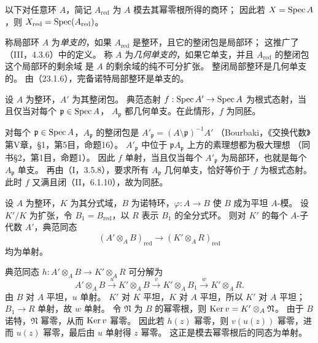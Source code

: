 
以下对任意环 $A$，简记 $A_{\mathrm{red}}$ 为 $A$ 模去其幂零根所得的商环；
因此若 $X=\operatorname{Spec} A$，则 $X_{\mathrm{red}}=\operatorname{Spec}(A_{\mathrm{red}})$。

称局部环 $A$ 为\emph{单支的}，如果 $A_{\mathrm{red}}$ 是整环，且它的整闭包是局部环；
这推广了（III，4.3.6）中的定义。
称 $A$ 为\emph{几何单支的}，如果它单支，并且 $A_{\mathrm{red}}$ 的整闭包这个局部环的剩余域
是 $A$ 的剩余域的纯不可分扩张。
整闭局部整环是几何单支的。
由（23.1.6），完备诺特局部整环是单支的。

设 $A$ 为整环，$A'$ 为其整闭包。
典范态射 $f:\operatorname{Spec} A'\to\operatorname{Spec} A$ 为根式态射，当且仅当对每个 $\mathfrak p\in\operatorname{Spec} A$，
$A_{\mathfrak p}$ 都几何单支。在此情形，$f$ 为同胚。

\eproof
对每个 $\mathfrak p\in\operatorname{Spec} A$，$A_{\mathfrak p}$ 的整闭包是
$A'_{\mathfrak p}=(A\setminus\mathfrak p)^{-1}A'$
（Bourbaki，《交换代数》第V章，\S1，第5目，命题16）。
$A'_{\mathfrak p}$ 中位于 $\mathfrak pA_{\mathfrak p}$ 上方的素理想都为极大理想
（同书\S2，第1目，命题1）。
因此 $f$ 单射，当且仅当每个 $A'_{\mathfrak p}$ 为局部环，也就是每个 $A_{\mathfrak p}$ 单支。
再由（I，3.5.8），要求所有 $A_{\mathfrak p}$ 几何单支，恰好等价于 $f$ 为根式态射。
此时 $f$ 又满且闭（II，6.1.10），故为同胚。
\finishproof

设 $A$ 为整环，$K$ 为其分式域，$B$ 为诺特环，$\varphi:A\to B$ 使 $B$ 成为平坦 $A$-模。
设 $K'/K$ 为扩张，令 $B_1=B_{\mathrm{red}}$，以 $R$ 表示 $B_1$ 的全分式环。
则对 $K'$ 的每个 $A$-子代数 $A'$，典范同态
\begin{equation}
 (A'\otimes_AB)_{\mathrm{red}}
 \longrightarrow (K'\otimes_AR)_{\mathrm{red}}
 \tag{23.2.3.1}
\end{equation}
均为单射。

\eproof
典范同态 $h:A'\otimes_AB\to K'\otimes_AR$ 可分解为
\[
 A'\otimes_AB\xrightarrow{u}K'\otimes_AB
 \xrightarrow{v}K'\otimes_AB_1
 \xrightarrow{w}K'\otimes_AR.
\]
由 $B$ 对 $A$ 平坦，$u$ 单射。
$K'$ 对 $K$ 平坦，$K$ 对 $A$ 平坦，所以 $K'$ 对 $A$ 平坦；
$B_1\to R$ 单射，故 $w$ 单射。
令 $\mathfrak N$ 为 $B$ 的幂零根，则 $\operatorname{Ker} v=K'\otimes_A\mathfrak N$。
由于 $B$ 诺特，$\mathfrak N$ 幂零，从而 $\operatorname{Ker} v$ 幂零。
因此若 $h(z)$ 幂零，则 $v(u(z))$ 幂零，进而 $u(z)$ 幂零，最后由 $u$ 单射得 $z$ 幂零。
这正是模去幂零根后的同态为单射。
\finishproof

